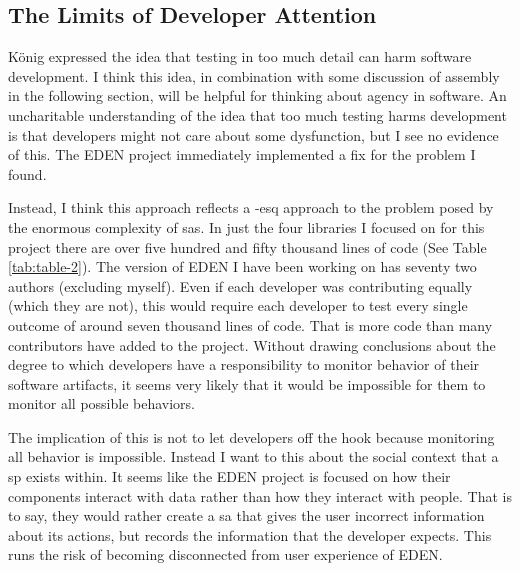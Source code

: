 \documentclass[a4paper,man,natbib,floatsintext]{apa6}
\begin{document}
   \subsection{The Limits of Developer Attention}
   König expressed the idea that testing in too much detail can harm software development. I think this idea, in combination with some discussion of assembly in the following section, will be helpful for thinking about agency in software. An uncharitable understanding of the idea that too much testing harms development is that developers might not care about some dysfunction, but I see no evidence of this. The \gls{EDEN} project immediately implemented a fix for the problem I found. 

   Instead, I think this approach reflects a \citet{Citton2017-xq}-esq approach to the problem posed by the enormous complexity of \glspl{sa}. In just the four libraries I focused on for this project there are over five hundred and fifty thousand lines of code (See Table \ref{tab:table-2}). The version of \gls{EDEN} I have been working on has seventy two authors (excluding myself). Even if each developer was contributing equally (which they are not), this would require each developer to test every single outcome of around seven thousand lines of code. That is more code than many contributors have added to the project. Without drawing conclusions about the degree to which developers have a responsibility to monitor behavior of their software artifacts, it seems very likely that it would be impossible for them to monitor all possible behaviors.

   The implication of this is not to let developers off the hook because monitoring all behavior is impossible. Instead I want to this about the social context that a \gls{sp} exists within. It seems like the \gls{EDEN} project is focused on how their components interact with data rather than how they interact with people. That is to say, they would rather create a \gls{sa} that gives the user incorrect information about its actions, but records the information that the developer expects. This runs the risk of becoming disconnected from user experience of \gls{EDEN}\footnotemark.

\end{document}
